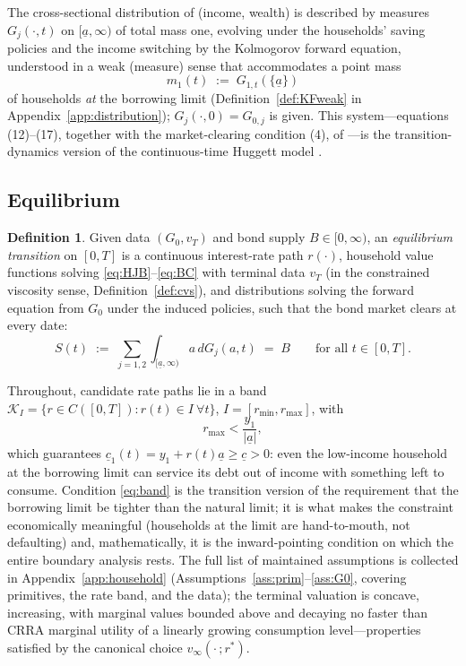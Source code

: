 \documentclass[11pt]{article}
\theoremstyle{definition}
\newtheorem{definition}[theorem]{Definition}
\theoremstyle{remark}
\newcommand{\ubar}[1]{\underline{#1}}
\newcommand{\Kcal}{\mathcal{K}}
\newcommand{\dd}{\,d}
\newcommand{\ubc}{\ubar{c}}
\newcommand{\uba}{\ubar{a}}
\begin{document}
The cross-sectional distribution of (income, wealth) is described by
measures $G_j(\cdot,t)$ on $[\uba,\infty)$ of total mass one, evolving
under the households' saving policies and the income switching by the
Kolmogorov forward equation, understood in a weak (measure) sense that
accommodates a point mass
\[
m_1(t)\;:=\;G_{1,t}(\{\uba\})
\]
of households \emph{at} the borrowing limit
(Definition~\ref{def:KFweak} in Appendix~\ref{app:distribution});
$G_j(\cdot,0)=G_{0,j}$ is given. This system---equations (12)--(17),
together with the market-clearing condition (4), of
\citet{AHLLM2022}---is the transition-dynamics version of the
continuous-time Huggett model \citep{Huggett1993}.

\subsection{Equilibrium}
\label{sec:eqmdef}

\begin{definition}\label{def:eqm}
Given data $(G_0,v_T)$ and bond supply $B\in[0,\infty)$, an
\emph{equilibrium transition} on $[0,T]$ is a continuous interest-rate
path $r(\cdot)$, household value functions solving
\eqref{eq:HJB}--\eqref{eq:BC} with terminal data $v_T$ (in the
constrained viscosity sense, Definition~\ref{def:cvs}), and
distributions solving the forward equation from $G_0$ under the
induced policies, such that the bond market clears at every date:
\begin{equation}\label{eq:clearing}
S(t)\;:=\;\sum_{j=1,2}\int_{[\uba,\infty)}a\dd G_j(a,t)\;=\;B
\qquad\text{for all }t\in[0,T].
\end{equation}
\end{definition}

Throughout, candidate rate paths lie in a band
$\Kcal_I=\{r\in C([0,T]):r(t)\in I\ \forall t\}$, $I=[r_{\min},
r_{\max}]$, with
\begin{equation}\label{eq:band}
r_{\max}<\frac{y_1}{|\uba|},
\end{equation}
which guarantees $\ubc_1(t)=y_1+r(t)\uba\ge\ubc>0$: even the
low-income household at the borrowing limit can service its debt out
of income with something left to consume. Condition \eqref{eq:band} is
the transition version of the requirement that the borrowing limit be
tighter than the natural limit; it is what makes the constraint
economically meaningful (households at the limit are hand-to-mouth,
not defaulting) and, mathematically, it is the inward-pointing
condition on which the entire boundary analysis rests. The full list
of maintained assumptions is collected in
Appendix~\ref{app:household}
(Assumptions~\ref{ass:prim}--\ref{ass:G0}, covering primitives, the
rate band, and the data); the terminal valuation is concave,
increasing, with marginal values bounded above and decaying no faster
than CRRA marginal utility of a linearly growing consumption
level---properties satisfied by the canonical choice
$v_\infty(\cdot\,;r^*)$.
\end{document}
